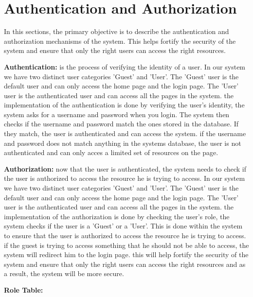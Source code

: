 \section{Authentication and Authorization}

In this sections, the primary objective is to describe the authentication and authorization mechanisms of the system. This helps fortify the security of the system and ensure that only the right users can access the right resources. \newline

\textbf{Authentication:} is the process of verifying the identity of a user. In our system we have two distinct user categories 'Guest' and 'User'. The 'Guest' user is the default user and can only access the home page and the login page. The 'User' user is the authenticated user and can access all the pages in the system. \newline
the implementation of the authentication is done by verifying the user's identity, the system asks for a username and password when you login. The system then checks if the username and password match the ones stored in the database. If they match, the user is authenticated and can access the system.
if the username and password does not match anything in the systems database, the user is not authenticated and can only acces a limited set of resources on the page. \newline

\textbf{Authorization:} now that the user is authenticated, the system needs to check if the user is authorized to access the resource he is trying to access. In our system we have two distinct user categories 'Guest' and 'User'. The 'Guest' user is the default user and can only access the home page and the login page. The 'User' user is the authenticated user and can access all the pages in the system.
the implementation of the authorization is done by checking the user's role, the system checks if the user is a 'Guest' or a 'User'. This is done within the system to ensure that the user is authorized to access the resource he is trying to access. if the guest is trying to access something that he should not be able to access, the system will redirect him to the login page. 
this will help fortify the security of the system and ensure that only the right users can access the right resources and as a result, the system will be more secure. \newline

\textbf{Role Table:} 

